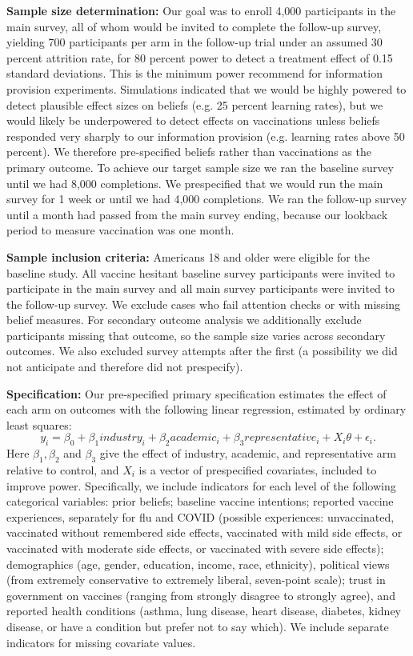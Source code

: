 \textbf{Sample size determination:} Our goal was to enroll 4,000 participants in the main 
survey, all of whom would be invited to complete the follow-up survey,
yielding 700 participants per arm in the follow-up trial under an assumed 30 percent attrition 
rate, for 80 percent power to detect a treatment effect of 0.15 standard deviations. 
This is the minimum power \citet{haaland2023designing} recommend for information provision 
experiments.  Simulations indicated that we would be highly powered to detect plausible effect 
sizes on beliefs (e.g. 25 percent learning rates), but we would likely be underpowered to
detect effects on vaccinations unless beliefs responded very sharply to our information
provision (e.g. learning rates above 50 percent). 
We therefore pre-specified beliefs rather than vaccinations as the primary outcome. 
To achieve our target sample size we ran the baseline survey until we had 8,000 completions. 
We prespecified that we would run the main survey for 1 week or until we had 4,000 completions. 
We ran the follow-up survey until a month had passed from the main survey ending, because our 
lookback period to measure  vaccination was one month. 

\textbf{Sample inclusion criteria:} Americans 18 and older were eligible for the baseline study.
All vaccine hesitant baseline survey participants were invited to participate in the main 
survey and all main survey participants were invited to the follow-up survey. We exclude cases 
who fail attention checks or with missing belief measures. For secondary outcome analysis 
we additionally exclude participants missing that outcome, so the sample size varies across 
secondary outcomes. We also excluded survey attempts  after the first (a possibility we did 
not anticipate and therefore did not prespecify).

\textbf{Specification:} Our pre-specified primary specification estimates the effect of each 
arm on outcomes with the following linear regression, estimated by ordinary least squares:
\begin{equation} \label{eq:main}
  y_i = \beta_0 + \beta_1 industry_i + \beta_2 academic_i + \beta_3 representative_i + 
    X_i \theta + \epsilon_i.
\end{equation}
Here $\beta_1, \beta_2$ and $\beta_3$ give the effect of industry, academic, and representative 
arm relative to control,  and $X_i$ is a vector of prespecified covariates, included to improve 
power.  Specifically, we include indicators for each level of the following categorical 
variables: prior beliefs; baseline vaccine intentions; reported vaccine experiences, separately 
for flu and COVID (possible experiences: unvaccinated, vaccinated without remembered side 
effects, vaccinated with mild side effects, or vaccinated with moderate side effects, or 
vaccinated with severe side effects); demographics (age, gender, education, income, race, 
ethnicity), political views (from extremely conservative to extremely liberal, seven-point scale); trust in 
government on vaccines (ranging from strongly disagree to strongly agree), and reported 
health conditions (asthma, lung disease, heart disease, diabetes, kidney disease, or 
have a condition but prefer not to say which). 
We include separate indicators for missing covariate values. 
 
